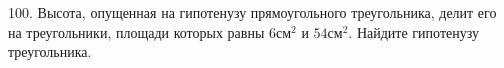 100. Высота, опущенная на гипотенузу прямоугольного треугольника, делит его на треугольники, площади которых равны $6\text{см}^2$ и $54\text{см}^2.$ Найдите гипотенузу треугольника.\\
